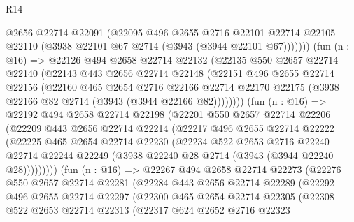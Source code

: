 \begin{lexlean}{R14}
\begin{coremodule}
              @2656
              @22714
              @22091
              (@22095
                @496
                @2655
                @2716
                @22101
                @22714
                @22105
                @22110
                (@3938 @22101 @67 @2714 (@3943 (@3944 @22101 @67)))))))
        (fun (n : @16) =>
        @22126
          @494
          @2658
          @22714
          @22132
          (@22135
            @550
            @2657
            @22714
            @22140
            (@22143
              @443
              @2656
              @22714
              @22148
              (@22151
                @496
                @2655
                @22714
                @22156
                (@22160
                  @465
                  @2654
                  @2716
                  @22166
                  @22714
                  @22170
                  @22175
                  (@3938 @22166 @82 @2714 (@3943 (@3944 @22166 @82))))))))
        (fun (n : @16) =>
        @22192
          @494
          @2658
          @22714
          @22198
          (@22201
            @550
            @2657
            @22714
            @22206
            (@22209
              @443
              @2656
              @22714
              @22214
              (@22217
                @496
                @2655
                @22714
                @22222
                (@22225
                  @465
                  @2654
                  @22714
                  @22230
                  (@22234
                    @522
                    @2653
                    @2716
                    @22240
                    @22714
                    @22244
                    @22249
                    (@3938 @22240 @28 @2714 (@3943 (@3944 @22240 @28)))))))))
        (fun (n : @16) =>
        @22267
          @494
          @2658
          @22714
          @22273
          (@22276
            @550
            @2657
            @22714
            @22281
            (@22284
              @443
              @2656
              @22714
              @22289
              (@22292
                @496
                @2655
                @22714
                @22297
                (@22300
                  @465
                  @2654
                  @22714
                  @22305
                  (@22308
                    @522
                    @2653
                    @22714
                    @22313
                    (@22317
                      @624
                      @2652
                      @2716
                      @22323

\end{coremodule}
\end{lexlean}
